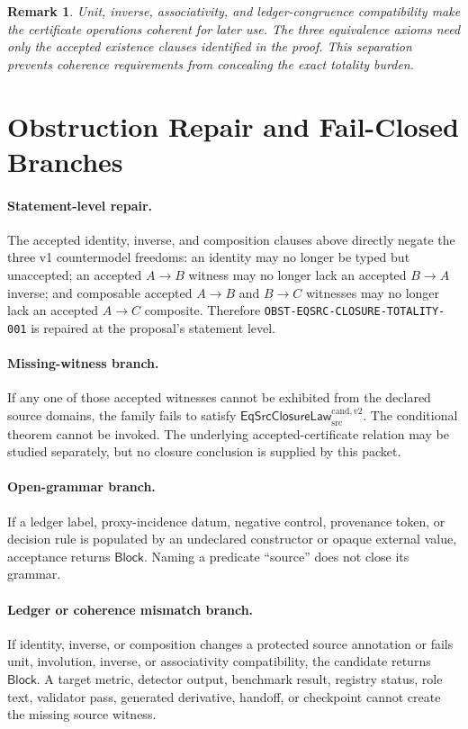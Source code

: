 \documentclass[11pt]{article}
\newtheorem{remark}{Remark}
\newcommand{\Law}{\mathsf{EqSrcClosureLaw}^{\mathrm{cand},v2}_{\mathrm{src}}}
\newcommand{\Block}{\mathsf{Block}}
\begin{document}
\begin{remark}
Unit, inverse, associativity, and ledger-congruence compatibility make the
certificate operations coherent for later use. The three equivalence axioms
need only the accepted existence clauses identified in the proof. This
separation prevents coherence requirements from concealing the exact
totality burden.
\end{remark}

\section{Obstruction Repair and Fail-Closed Branches}

\paragraph{Statement-level repair.}
The accepted identity, inverse, and composition clauses above directly negate
the three v1 countermodel freedoms: an identity may no longer be typed but
unaccepted; an accepted \(A\to B\) witness may no longer lack an accepted
\(B\to A\) inverse; and composable accepted \(A\to B\) and \(B\to C\)
witnesses may no longer lack an accepted \(A\to C\) composite. Therefore
\texttt{OBST-EQSRC-CLOSURE-TOTALITY-001} is repaired at the proposal's
statement level.

\paragraph{Missing-witness branch.}
If any one of those accepted witnesses cannot be exhibited from the declared
source domains, the family fails to satisfy \(\Law\). The conditional theorem
cannot be invoked. The underlying accepted-certificate relation may be studied
separately, but no closure conclusion is supplied by this packet.

\paragraph{Open-grammar branch.}
If a ledger label, proxy-incidence datum, negative control, provenance token,
or decision rule is populated by an undeclared constructor or opaque external
value, acceptance returns \(\Block\). Naming a predicate ``source'' does not
close its grammar.

\paragraph{Ledger or coherence mismatch branch.}
If identity, inverse, or composition changes a protected source annotation or
fails unit, involution, inverse, or associativity compatibility, the candidate
returns \(\Block\). A target metric, detector output, benchmark result,
registry status, role text, validator pass, generated derivative, handoff, or
checkpoint cannot create the missing source witness.
\end{document}
